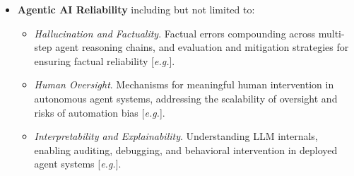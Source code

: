 \documentclass{article}
\newcommand{\eg}{\textit{e.g.}}
\begin{document}
\begin{itemize}[leftmargin=10pt,itemsep=1pt,topsep=2pt]
\begin{itemize}[itemsep=1pt,topsep=0pt]
\item \textit{Agent-Memory Attack}. Attacks that compromise the long-term memory or knowledge bases of LLM agents, and defenses against them  [\eg \cite{chen2024agentpoison}].

\item \textit{Agentic Knowledge Attacks}. Knowledge base poisoning, backdoored retrievers, and corrupted upstream components that persistently manipulate agents, and defenses against them [\eg \cite{zou2025poisonedrag}].


\item \textit{Agentic Control Flow Attacks}. Attacks that hijack agent decision-making at runtime by manipulating planning, and defenses against them[\eg \cite{zhang2025asb, xu2026storage}].

\item \textit{Privacy and Data Leakage}. Training data extraction, membership inference, and sensitive data leakage, and mitigation against them [\eg \cite{lukas2023analyzing, carlini2023memorization}].
\end{itemize}

\item \textbf{Agentic AI Reliability} including but not limited to:
\begin{itemize}[itemsep=1pt,topsep=0pt]

\item \textit{Hallucination and Factuality}. Factual errors compounding across multi-step agent reasoning chains, and evaluation and mitigation strategies for ensuring factual reliability [\eg \cite{lin2022truthfulqa, tian2023finetuning}].

\item \textit{Human Oversight}. Mechanisms for meaningful human intervention in autonomous agent systems, addressing the scalability of oversight and risks of automation bias [\eg \cite{burns2024weak, kenton2024scalable}].

\item \textit{Interpretability and Explainability}. Understanding LLM internals, enabling auditing, debugging, and behavioral intervention in deployed agent systems [\eg \cite{conmy2023automated, tigges2024llm}].


\end{itemize}
\end{itemize}
\end{document}

